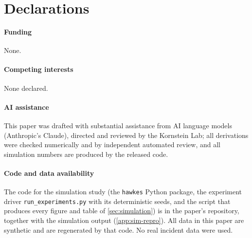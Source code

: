 \documentclass[11pt]{article}
\begin{document}

\section*{Declarations}
\paragraph{Funding} None.
\paragraph{Competing interests} None declared.
\paragraph{AI assistance} This paper was drafted with substantial assistance
from AI language models (Anthropic's Claude), directed and reviewed by the
Kornstein Lab; all derivations were checked numerically and by independent
automated review, and all simulation numbers are produced by the released
code.
\paragraph{Code and data availability} The code for the simulation study (the
\texttt{hawkes} Python package, the experiment driver
\texttt{run\_experiments.py} with its deterministic seeds, and the script that
produces every figure and table of \cref{sec:simulation}) is in the paper's
repository, together with the simulation output (\cref{app:sim-repro}). All
data in this paper are synthetic and are regenerated by that code. No real
incident data were used.
\end{document}
